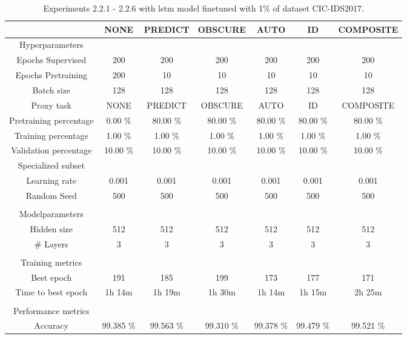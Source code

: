 \begin{table}[htb]
    \centering
    \caption{Experiments 2.2.1 - 2.2.6 with \gls{lstm} model finetuned with 1\% of dataset CIC-IDS2017.}
    \label{table:results:lstm:flows_1}
    \begin{tabular}{@{}ccccccc@{}}
        \toprule
         &  NONE &  PREDICT &  OBSCURE &  AUTO &  ID &  COMPOSITE \\
        \midrule
        Hyperparameters &  &  &  &  &  &  \\
        Epochs Supervised &  200 &  200 &  200 &  200 &  200 &  200 \\
        Epochs Pretraining &  200 &  10 &  10 &  10 &  10 &  10 \\
        Batch size &  128 &  128 &  128 &  128 &  128 &  128 \\
        Proxy task &  NONE &  PREDICT &  OBSCURE &  AUTO &  ID &  COMPOSITE \\
        Pretraining percentage &  0.00 \% &  80.00 \% &  80.00 \% &  80.00 \% &  80.00 \% &  80.00 \% \\
        Training percentage &  1.00 \% &  1.00 \% &  1.00 \% &  1.00 \% &  1.00 \% &  1.00 \% \\
        Validation percentage &  10.00 \% &  10.00 \% &  10.00 \% &  10.00 \% &  10.00 \% &  10.00 \% \\
        Specialized subset &   &   &   &   &   &   \\
        Learning rate &  0.001 &  0.001 &  0.001 &  0.001 &  0.001 &  0.001 \\
        Random Seed &  500 &  500 &  500 &  500 &  500 &  500 \\
         \\
        Modelparameters &  &  &  &  &  &  \\
        Hidden size &  512 &  512 &  512 &  512 &  512 &  512 \\
        \# Layers &  3 &  3 &  3 &  3 &  3 &  3 \\
         \\
        Training metrics &  &  &  &  &  &  \\
        Best epoch &  191 &  185 &  199 &  173 &  177 &  171 \\
        Time to best epoch &  1h 14m &  1h 19m &  1h 30m &  1h 14m &  1h 15m &  2h 25m \\
         \\
        Performance metrics &  &  &  &  &  &  \\
        Accuracy &  99.385 \% &  99.563 \% &  99.310 \% &  99.378 \% &  99.479 \% &  99.521 \% \\

\end{tabular}
\end{table}
